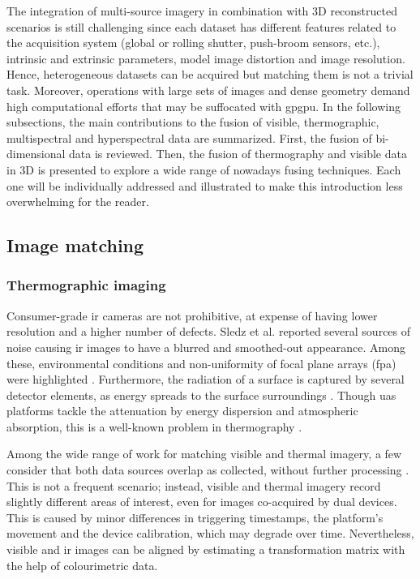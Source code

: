 The integration of multi-source imagery in combination with 3D reconstructed scenarios is still challenging since each dataset has different features related to the acquisition system (global or rolling shutter, push-broom sensors, etc.), intrinsic and extrinsic parameters, model image distortion and image resolution. Hence, heterogeneous datasets can be acquired but matching them is not a trivial task. Moreover, operations with large sets of images and dense geometry demand high computational efforts that may be suffocated with \acrshort{gpgpu}. In the following subsections, the main contributions to the fusion of visible, thermographic, multispectral and hyperspectral data are summarized. First, the fusion of bi-dimensional data is reviewed. Then, the fusion of thermography and visible data in 3D is presented to explore a wide range of nowadays fusing techniques. Each one will be individually addressed and illustrated to make this introduction less overwhelming for the reader.

\subsection{Image matching}

\subsubsection{Thermographic imaging}

Consumer-grade \acrshort{ir} cameras are not prohibitive, at expense of having lower resolution and a higher number of defects. Sledz et al. \cite{sledz_thermal_2018} reported several sources of noise causing \acrshort{ir} images to have a blurred and smoothed-out appearance. Among these, environmental conditions and non-uniformity of focal plane arrays (\acrshort{fpa}) were highlighted \cite{javadnejad_photogrammetric_2020}. Furthermore, the radiation of a surface is captured by several detector elements, as energy spreads to the surface surroundings \cite{vollmer_infrared_2017}. Though \acrshort{uas} platforms tackle the attenuation by energy dispersion and atmospheric absorption, this is a well-known problem in thermography \cite{gonzalez_thermal_2019, vollmer_infrared_2017, quattrochi_thermal_1999}.

Among the wide range of work for matching visible and thermal imagery, a few consider that both data sources overlap as collected, without further processing \cite{hou_fusing_2021, stojcsics_high_2018}. This is not a frequent scenario; instead, visible and thermal imagery record slightly different areas of interest, even for images co-acquired by dual devices. This is caused by minor differences in triggering timestamps, the platform's movement and the device calibration, which may degrade over time. Nevertheless, visible and \acrshort{ir} images can be aligned by estimating a transformation matrix with the help of colourimetric data. 

